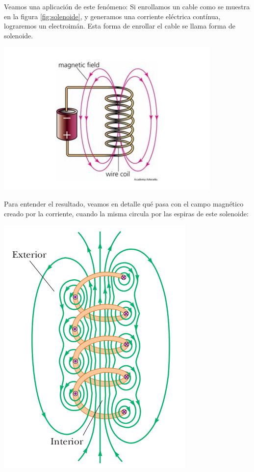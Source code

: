 \documentclass{article}
\begin{document}
Veamos una aplicación de este fenómeno: Si enrollamos un cable como se muestra en la figura \ref{fig:solenoide}, y generamos una corriente eléctrica contínua, lograremos un electroimán. Esta forma de enrollar el cable se llama forma de solenoide.
\begin{center}
	\includegraphics[scale=0.50]{figuras/electroiman-3.png}
\label{fig:solenoide}
\end{center}
Para entender el resultado, veamos en detalle qué pasa con el campo magnético creado por la corriente, cuando la misma circula por las espiras de este solenoide:
\begin{center}
	\includegraphics[scale=0.50]{figuras/solenoide-1.png}
\label{fig:solenoide-1}
\end{center}
\end{document}
